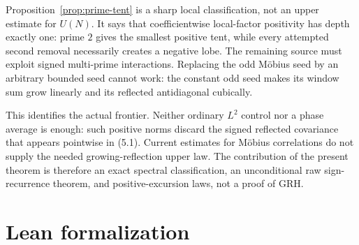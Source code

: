 \documentclass[11pt]{article}
\theoremstyle{remark}
\newcommand{\GRH}{\mathrm{GRH}}
\begin{document}
Proposition~\ref{prop:prime-tent} is a sharp local classification, not an upper estimate for
$U(N)$.  It says that coefficientwise local-factor positivity has depth exactly one: prime $2$
gives the smallest positive tent, while every attempted second removal necessarily creates a
negative lobe.  The remaining source must exploit signed multi-prime interactions.  Replacing the
odd M\"obius seed by an arbitrary bounded seed cannot work: the constant odd seed makes its window
sum grow linearly and its reflected antidiagonal cubically.

This identifies the actual frontier.  Neither ordinary $L^2$ control nor a phase average is
enough: such positive norms discard the signed reflected covariance that appears pointwise in
(5.1).  Current estimates for Möbius correlations do not supply the needed growing-reflection
upper law.  The contribution of the present theorem is therefore an exact spectral classification,
an unconditional raw sign-recurrence theorem, and positive-excursion laws, not a proof of
$\GRH$.

\section{Lean formalization}
\label{sec:lean}
\end{document}
